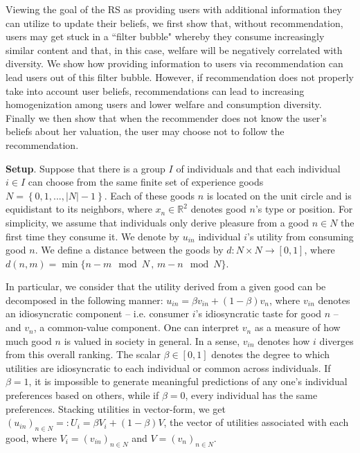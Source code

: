 \documentclass[sigconf]{acmart}
\begin{document}
Viewing the goal of the RS as providing users with additional information they can utilize to update their beliefs, we first show that, without recommendation, users may get stuck in a ``filter bubble" whereby they consume increasingly similar content and that, in this case, welfare will be negatively correlated with diversity. We show how providing information to users via recommendation can lead users out of this filter bubble. However, if recommendation does not properly take into account user beliefs, recommendations can lead to increasing homogenization among users and lower welfare and consumption diversity. Finally we then show that when the recommender does not know the user's beliefs about her valuation, the user may choose not to follow the recommendation.
\par
\noindent \textbf{Setup}. Suppose that there is a group $I$ of individuals and that each individual $i \in I$ can choose from the same finite set of experience goods $N=\left\{0,1,...,|N|-1\right\}$. Each of these goods $n$ is located on the unit circle and is equidistant to its neighbors, where $x_n \in \mathbb R^2$ denotes good $n$'s type or position. For simplicity, we assume that individuals only derive pleasure from a good $n \in N$ the first time they consume it. We denote by $u_{in}$ individual $i$'s utility from consuming good $n$.  We define a distance between the goods by $d:N\times N \to [0,1]$, where $d(n,m)=\min\{n-m \mod N\,,\,m-n \mod N \}$.
\par
In particular, we consider that the utility derived from a given good can be decomposed in the following manner: $u_{in}=\beta v_{in} + (1-\beta) v_n$, where $v_{in}$ denotes an idiosyncratic component -- i.e. consumer $i$'s idiosyncratic taste for good $n$ --  and $v_{n}$, a common-value component. 
One can interpret $v_n$ as a measure of how much good $n$ is valued in society in general. In a sense, $v_{in}$ denotes how $i$ diverges from this overall ranking. 
The scalar $\beta \in [0,1]$ denotes the degree to which utilities are idiosyncratic to each individual or common across individuals. If $\beta=1$, it is impossible to generate meaningful predictions of any one's individual preferences based on others, while if $\beta=0$, every individual has the same preferences.
Stacking utilities in vector-form, we get ${\left(u_{in}\right)}_{n \in N}=:U_i=\beta V_i+(1 - \beta) V $, the vector of utilities associated with each good, where $V_i ={\left(v_{in}\right)}_{n \in N}$ and $V={\left(v_{n}\right)}_{n \in N}$.
\par
\end{document}
